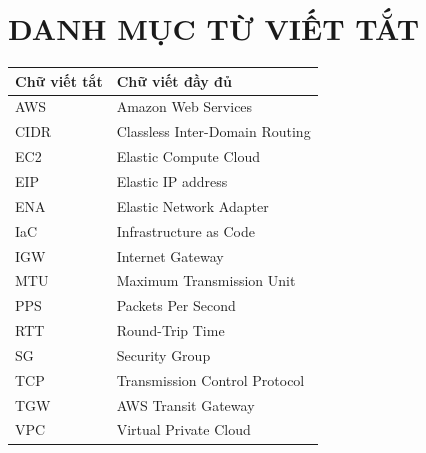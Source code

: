 \chapter*{DANH MỤC TỪ VIẾT TẮT}

\begin{table}[h]
    \centering
    \begin{tabularx}{\textwidth}{l X}
    \toprule
    \textbf{Chữ viết tắt} & \textbf{Chữ viết đầy đủ} \\
    \midrule
    AWS & Amazon Web Services \\
    CIDR & Classless Inter-Domain Routing \\
    EC2 & Elastic Compute Cloud \\
    EIP & Elastic IP address \\
    ENA & Elastic Network Adapter \\
    IaC & Infrastructure as Code \\
    IGW & Internet Gateway \\
    MTU & Maximum Transmission Unit \\
    PPS & Packets Per Second \\
    RTT & Round-Trip Time \\
    SG & Security Group \\
    TCP & Transmission Control Protocol \\
    TGW & AWS Transit Gateway \\
    VPC & Virtual Private Cloud \\
    \bottomrule
    \end{tabularx}
\end{table}
